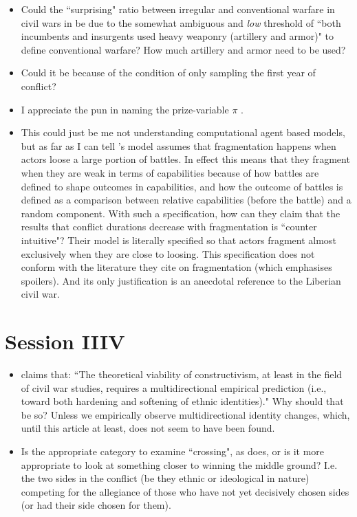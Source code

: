 \documentclass[12pt]{article}
\begin{document}
\begin{itemize}

	\item Could the ``surprising" ratio between irregular and conventional
		warfare in civil wars in \citet{KALYVAS_2010} be due to the
		somewhat ambiguous and \textit{low} threshold of ``both
		incumbents and insurgents used heavy weaponry (artillery and
		armor)" to define conventional warfare? How much artillery and
		armor need to be used? 

	\item Could it be because of the condition of only sampling the first
		year of conflict?

	\item I appreciate the pun in naming the prize-variable $\pi$
		\citep{Findley_2012}.

	\item This could just be me not understanding computational agent based
		models, but as far as I can tell \citet{Findley_2012}'s model
		assumes that fragmentation happens when actors loose a large
		portion of battles. In effect this means that they fragment when
		they are weak in terms of capabilities because of how battles
		are defined to shape outcomes in capabilities, and how the
		outcome of battles is defined as a comparison between relative
		capabilities (before the battle) and a random component. With
		such a specification, how can they claim that the results that
		conflict durations decrease with fragmentation is ``counter
		intuitive"? Their model is literally specified so that actors
		fragment almost exclusively when they are close to loosing. This
		specification does not conform with the literature they cite on
		fragmentation (which emphasises spoilers). And its only
		justification is an anecdotal reference to the Liberian civil
		war. 

\end{itemize}

\section{Session IIIV}

\begin{itemize}

	\item \citet{Kalyvas_2008} claims that: ``The theoretical viability of
		constructivism, at least in the field of civil war studies,
		requires a multidirectional empirical prediction (i.e., toward
		both hardening and softening of ethnic identities)." Why should
		that be so? Unless we empirically observe multidirectional
		identity changes, which, until this article at least, does
		not seem to have been found.

	\item Is the appropriate category to examine ``crossing", as
		\citet{Kalyvas_2008} does, or is it more appropriate to look at
		something closer to winning the middle ground? I.e. the two
		sides in the conflict (be they ethnic or ideological in nature)
		competing for the allegiance of those who have not yet
		decisively chosen sides (or had their side chosen for them). 

\end{itemize}

\pagebreak



\end{document}
